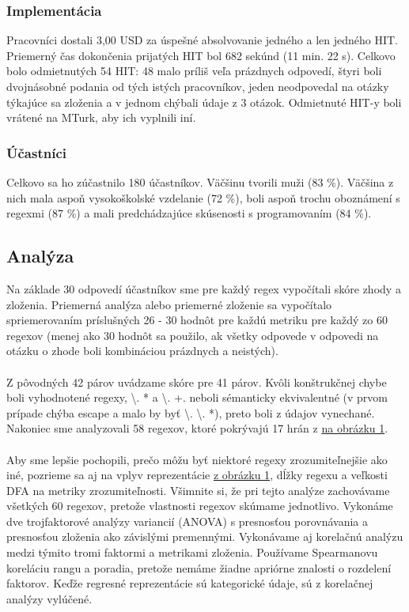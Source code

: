 \documentclass[10pt,twoside,slovak,a4paper]{article}
\begin{document}
\subsubsection{Implementácia}
Pracovníci dostali 3,00 USD za úspešné absolvovanie jedného a len jedného HIT. Priemerný čas dokončenia prijatých HIT bol 682 sekúnd (11 min. 22 s). Celkovo bolo odmietnutých 54 HIT: 48 malo príliš veľa prázdnych odpovedí, štyri boli dvojnásobné podania od tých istých pracovníkov, jeden neodpovedal na otázky týkajúce sa zloženia a v jednom chýbali údaje z 3 otázok. Odmietnuté HIT-y boli vrátené na MTurk, aby ich vyplnili iní.\cite{Chapman2017}
\subsubsection{Účastníci}
Celkovo sa ho zúčastnilo 180 účastníkov. Väčšinu tvorili muži (83 \%). Väčšina z nich mala aspoň vysokoškolské vzdelanie (72 \%), boli aspoň trochu oboznámení s regexmi (87 \%) a mali predchádzajúce skúsenosti s programovaním (84 \%).\cite{Chapman2017}\\
\subsection{Analýza}
Na základe 30 odpovedí účastníkov sme pre každý regex vypočítali skóre zhody a zloženia. Priemerná analýza alebo priemerné zloženie sa vypočítalo spriemerovaním príslušných 26 - 30 hodnôt pre každú metriku pre každý zo 60 regexov (menej ako 30 hodnôt sa použilo, ak všetky odpovede v odpovedi na otázku o zhode boli kombináciou prázdnych a neistých).\cite{Chapman2017}\\\\
Z pôvodných 42 párov uvádzame skóre pre 41 párov. Kvôli konštrukčnej chybe boli vyhodnotené regexy, \textbackslash . * a \textbackslash . +. neboli sémanticky ekvivalentné (v prvom prípade chýba escape a malo by byť \textbackslash . \textbackslash . *), preto boli z údajov vynechané. Nakoniec sme analyzovali 58 regexov, ktoré pokrývajú 17 hrán z \hyperref[fig:obrazok1]{na obrázku 1}.\cite{Chapman2017}\\\\
Aby sme lepšie pochopili, prečo môžu byť niektoré regexy zrozumiteľnejšie ako iné, pozrieme sa aj na vplyv reprezentácie \hyperref[fig:obrazok1]{z obrázku 1}, dĺžky regexu a veľkosti DFA na metriky zrozumiteľnosti. Všimnite si, že pri tejto analýze zachovávame všetkých 60 regexov, pretože vlastnosti regexov skúmame jednotlivo. Vykonáme dve trojfaktorové analýzy variancií (ANOVA) s presnosťou porovnávania a presnosťou zloženia ako závislými premennými. Vykonávame aj korelačnú analýzu medzi týmito tromi faktormi a metrikami zloženia. Používame Spearmanovu koreláciu rangu a poradia, pretože nemáme žiadne apriórne znalosti o rozdelení faktorov. Keďže regresné reprezentácie sú kategorické údaje, sú z korelačnej analýzy vylúčené.\cite{Chapman2017}
\end{document}
